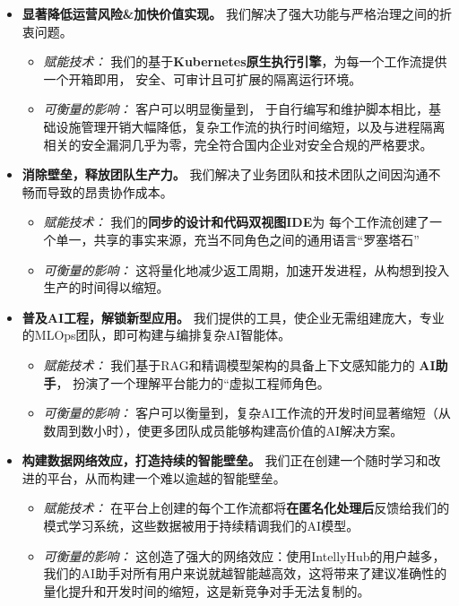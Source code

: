 \documentclass[11点, A4纸, 单面]{article}
\begin{document}
\begin{itemize}
    \item \textbf{显著降低运营风险\&加快价值实现。} 我们解决了强大功能与严格治理之间的折衷问题。
    \begin{itemize}
        \item \textit{赋能技术：} 我们的基于\textbf{Kubernetes原生执行引擎}，为每一个工作流提供一个开箱即用， 安全、可审计且可扩展的隔离运行环境。
        \item \textit{可衡量的影响：} 客户可以明显衡量到， 于自行编写和维护脚本相比，基础设施管理开销大幅降低，复杂工作流的执行时间缩短，以及与进程隔离相关的安全漏洞几乎为零，完全符合国内企业对安全合规的严格要求。
    \end{itemize}

    \item \textbf{消除壁垒，释放团队生产力。} 我们解决了业务团队和技术团队之间因沟通不畅而导致的昂贵协作成本。
    \begin{itemize}
        \item \textit{赋能技术：} 我们的\textbf{同步的设计和代码双视图IDE}为 每个工作流创建了一个单一，共享的事实来源，充当不同角色之间的通用语言“罗塞塔石”
        \item \textit{可衡量的影响：} 这将量化地减少返工周期，加速开发进程，从构想到投入生产的时间得以缩短。
    \end{itemize}

    \item \textbf{普及AI工程，解锁新型应用。} 我们提供的工具，使企业无需组建庞大，专业的MLOps团队，即可构建与编排复杂AI智能体。
    \begin{itemize}
        \item \textit{赋能技术：} 我们基于RAG和精调模型架构的具备上下文感知能力的 \textbf{AI助手}， 扮演了一个理解平台能力的“虚拟工程师角色。 
        \item \textit{可衡量的影响：} 客户可以衡量到，复杂AI工作流的开发时间显著缩短（从数周到数小时），使更多团队成员能够构建高价值的AI解决方案。
    \end{itemize}
    
    \item \textbf{构建数据网络效应，打造持续的智能壁垒。} 我们正在创建一个随时学习和改进的平台，从而构建一个难以逾越的智能壁垒。
    \begin{itemize}
        \item \textit{赋能技术：} 在平台上创建的每个工作流都将\textbf{在匿名化处理后}反馈给我们的模式学习系统，这些数据被用于持续精调我们的AI模型。
        \item \textit{可衡量的影响：} 这创造了强大的网络效应：使用IntellyHub的用户越多，我们的AI助手对所有用户来说就越智能越高效，这将带来了建议准确性的量化提升和开发时间的缩短，这是新竞争对手无法复制的。
    \end{itemize}
\end{itemize}
\end{document}

